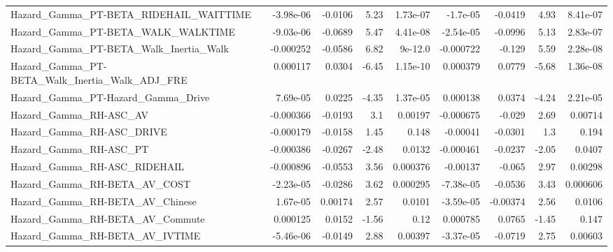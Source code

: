 \begin{tabular}{lrrrrrrrr}
Hazard\_Gamma\_PT-BETA\_RIDEHAIL\_WAITTIME             &   -3.98e-06 &      -0.0106 &     5.23 & 1.73e-07 &   -1.7e-05 &     -0.0419 &         4.93 &      8.41e-07 \\
Hazard\_Gamma\_PT-BETA\_WALK\_WALKTIME                 &   -9.03e-06 &      -0.0689 &     5.47 & 4.41e-08 &  -2.54e-05 &     -0.0996 &         5.13 &      2.83e-07 \\
Hazard\_Gamma\_PT-BETA\_Walk\_Inertia\_Walk             &   -0.000252 &      -0.0586 &     6.82 &  9e-12.0 &  -0.000722 &      -0.129 &         5.59 &      2.28e-08 \\
Hazard\_Gamma\_PT-BETA\_Walk\_Inertia\_Walk\_ADJ\_FRE     &    0.000117 &       0.0304 &    -6.45 & 1.15e-10 &   0.000379 &      0.0779 &        -5.68 &      1.36e-08 \\
Hazard\_Gamma\_PT-Hazard\_Gamma\_Drive                 &    7.69e-05 &       0.0225 &    -4.35 & 1.37e-05 &   0.000138 &      0.0374 &        -4.24 &      2.21e-05 \\
Hazard\_Gamma\_RH-ASC\_AV                             &   -0.000366 &      -0.0193 &      3.1 &  0.00197 &  -0.000675 &      -0.029 &         2.69 &       0.00714 \\
Hazard\_Gamma\_RH-ASC\_DRIVE                          &   -0.000179 &      -0.0158 &     1.45 &    0.148 &   -0.00041 &     -0.0301 &          1.3 &         0.194 \\
Hazard\_Gamma\_RH-ASC\_PT                             &   -0.000386 &      -0.0267 &    -2.48 &   0.0132 &  -0.000461 &     -0.0237 &        -2.05 &        0.0407 \\
Hazard\_Gamma\_RH-ASC\_RIDEHAIL                       &   -0.000896 &      -0.0553 &     3.56 & 0.000376 &   -0.00137 &      -0.065 &         2.97 &       0.00298 \\
Hazard\_Gamma\_RH-BETA\_AV\_COST                       &   -2.23e-05 &      -0.0286 &     3.62 & 0.000295 &  -7.38e-05 &     -0.0536 &         3.43 &      0.000606 \\
Hazard\_Gamma\_RH-BETA\_AV\_Chinese                    &    1.67e-05 &      0.00174 &     2.57 &   0.0101 &  -3.59e-05 &    -0.00374 &         2.56 &        0.0106 \\
Hazard\_Gamma\_RH-BETA\_AV\_Commute                    &    0.000125 &       0.0152 &    -1.56 &     0.12 &   0.000785 &      0.0765 &        -1.45 &         0.147 \\
Hazard\_Gamma\_RH-BETA\_AV\_IVTIME                     &   -5.46e-06 &      -0.0149 &     2.88 &  0.00397 &  -3.37e-05 &     -0.0719 &         2.75 &       0.00603 \\

\end{tabular}
